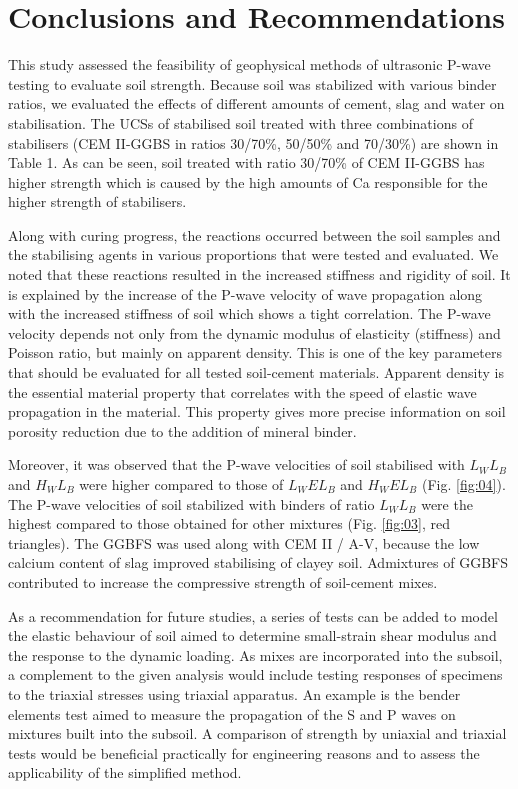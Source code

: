 \documentclass[10pt,twoside,twocolumn,a4paper]{article}
\begin{document}
\section{Conclusions and Recommendations}

This study assessed the feasibility of geophysical methods of ultrasonic P-wave testing to evaluate soil strength. Because soil was stabilized with various binder ratios, we evaluated the effects of different amounts of cement, slag and water on stabilisation. The UCSs of stabilised soil treated with three combinations of stabilisers (CEM II-GGBS in ratios 30/70\%, 50/50\% and 70/30\%) are shown in Table 1. As can be seen, soil treated with ratio 30/70\% of CEM II-GGBS has higher strength which is caused by the high amounts of Ca responsible for the higher strength of stabilisers. 

Along with curing progress, the reactions occurred between the soil samples and the stabilising agents in various proportions that were tested and evaluated. We noted that these reactions resulted in the increased stiffness and rigidity of soil. It is explained by the increase of the P-wave velocity of wave propagation along with the increased stiffness of soil which shows a tight correlation. The P-wave velocity depends not only from the dynamic modulus of elasticity (stiffness) and Poisson ratio, but mainly on apparent density. This is one of the key parameters that should be evaluated for all tested soil-cement materials. Apparent density is the essential material property that correlates with the speed of elastic wave propagation in the material. This property gives more precise information on soil porosity reduction due to the addition of mineral binder.

Moreover, it was observed that the P-wave velocities of soil stabilised with $L_WL_B$ and $H_WL_B$ were higher compared to those of $L_WEL_B$ and $H_WEL_B$ (Fig. \ref{fig:04}). The P-wave velocities of soil stabilized with binders of ratio $L_WL_B$ were the highest compared to those obtained for other mixtures (Fig. \ref{fig:03}, red triangles). The GGBFS was used along with CEM II / A-V, because the low calcium content of slag improved stabilising of clayey soil. Admixtures of GGBFS contributed to increase the compressive strength of soil-cement mixes. 

As a recommendation for future studies, a series of tests can be added to model the elastic behaviour of soil aimed to determine small-strain shear modulus and the response to the dynamic loading. As mixes are incorporated into the subsoil, a complement to the given analysis would include testing responses of specimens to the triaxial stresses using triaxial apparatus. An example is the bender elements test aimed to measure the propagation of the S and P waves on mixtures built into the subsoil. A comparison of strength by uniaxial and triaxial tests would be beneficial practically for engineering reasons and to assess the applicability of the simplified method.
\end{document}
